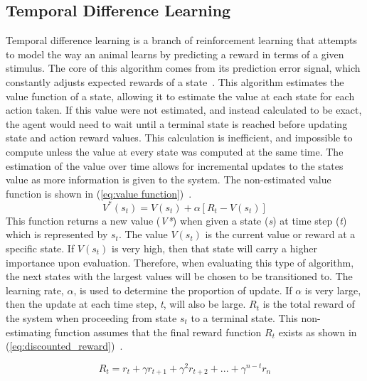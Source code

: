 \documentclass[12pt,american]{report}
\begin{document}
\subsection{Temporal Difference Learning}
Temporal difference learning is a branch of reinforcement learning that attempts to model the way an animal learns by predicting a reward in terms of a given stimulus. The core of this algorithm comes from its prediction error signal, which constantly adjusts expected rewards of a state~\cite{o2003temporal}. This algorithm estimates the value function of a state, allowing it to estimate the value at each state for each action taken.  If this value were not estimated, and instead calculated to be exact, the agent would need to wait until a terminal state is reached before updating state and action reward values. This calculation is inefficient, and impossible to compute unless the value at every state was computed at the same time. The estimation of the value over time allows for incremental updates to the states value as more information is given to the system. The non-estimated value function is shown in (\ref{eq:value function})~\cite{Eden}.
        \begin{equation}
            \label{eq:value function}
            V^*(s_{t}) = V(s_{t}) + \alpha[R_{t}-V(s_{t})]
        \end{equation}
This function returns a new value (\textit{V*}) when given a state (\textit{s}) at time step (\textit{t}) which is represented by \textit{$s_t$}. The value \textit{$V(s_t)$} is the current value or reward at a specific state.  If \textit{$V(s_t)$} is very high, then that state will carry a higher importance upon evaluation. Therefore, when evaluating this type of algorithm, the next states with the largest values will be chosen to be transitioned to. The learning rate, \textit{$\alpha$}, is used to determine the proportion of update.  If \textit{$\alpha$} is very large, then the update at each time step, \textit{t}, will also be large.  \textit{$R_t$} is the total reward of the system when proceeding from state \textit{$s_t$} to a terminal state.  This non-estimating function assumes that the final reward function \textit{$R_{t}$} exists as shown in (\ref{eq:discounted_reward})~\cite{matiisen_2015}.

\begin{equation}
            \label{eq:discounted_reward}
            R_{t} = r_t + \gamma r_{t+1} + \gamma^2 r_{t+2} + ... + \gamma^{n-t}r_n 
        \end{equation}
\end{document}
